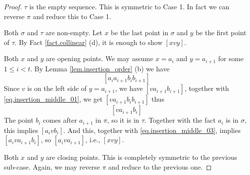 \documentclass[12pt]{article}
\begin{document}
\begin{proof}
 $\tau$ is the empty sequence.
This is symmetric to Case 1. In fact we can reverse $\pi$ and reduce this to Case 1.

 Both $\sigma$ and $\tau$ are non-empty.
Let $x$ be the last point in $\sigma$ and $y$ be the first point of $\tau$.
By Fact \ref{fact.collinear} (d), it is enough to show $[xvy]$.

 Both $x$ and $y$ are opening points.
We may assume $x = a_i$ and $y=a_{i+1}$ for some $1 \le i < t$.
By Lemma \ref{lem.insertion_order} (b) we have
\begin{equation}\label{eq.insertion_middle_01}
[a_i a_{i+1} b_i b_{i+1}]
\end{equation}
Since $v$ is on the left side of $y = a_{i+1}$, we have
$[v a_{i+1} b_{i+1}]$,
together with \eqref{eq.insertion_middle_01},
we get $[va_{i+1} b_i b_{i+1}]$ thus 
\begin{equation}\label{eq.insertion_middle_03}
[v a_{i+1} b_{i}]
\end{equation}
The point $b_{i}$ comes after $a_{i+1}$ in $\pi$, so it is in $\tau$.
Together with the fact $a_i$ is in $\sigma$, this implies $[a_ivb_i]$. And this, together with \eqref{eq.insertion_middle_03}, implies
$[a_iva_{i+1}b_i]$, so $[a_i v a_{i+1}]$, i.e., $[xvy]$.

 Both $x$ and $y$ are closing points.
This is completely symmetric to the previous sub-case. Again,
we may reverse $\pi$ and reduce to the previous one.


\end{proof}
\end{document}
